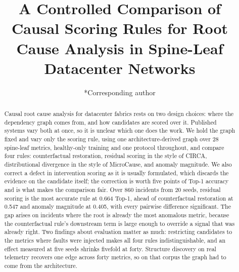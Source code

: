 \documentclass[conference]{IEEEtran}
\begin{document}
\title{A Controlled Comparison of Causal Scoring Rules for Root Cause Analysis in Spine-Leaf Datacenter Networks}


\author{
*Corresponding author
\and
{}
\and
{}
\and
{}
}

\maketitle

\begin{abstract}
Causal root cause analysis for datacenter fabrics rests on two design choices: where the dependency graph comes from, and how candidates are scored over it. Published systems vary both at once, so it is unclear which one does the work. We hold the graph fixed and vary only the scoring rule, using one architecture-derived graph over 28 spine-leaf metrics, healthy-only training and one protocol throughout, and compare four rules: counterfactual restoration, residual scoring in the style of CIRCA, distributional divergence in the style of MicroCause, and anomaly magnitude. We also correct a defect in intervention scoring as it is usually formulated, which discards the evidence on the candidate itself; the correction is worth five points of Top-1 accuracy and is what makes the comparison fair. Over 860 incidents from 20 seeds, residual scoring is the most accurate rule at 0.664 Top-1, ahead of counterfactual restoration at 0.547 and anomaly magnitude at 0.405, with every pairwise difference significant. The gap arises on incidents where the root is already the most anomalous metric, because the counterfactual rule's downstream term is large enough to override a signal that was already right. Two findings about evaluation matter as much: restricting candidates to the metrics where faults were injected makes all four rules indistinguishable, and an effect measured at five seeds shrinks fivefold at forty. Structure discovery on real telemetry recovers one edge across forty metrics, so on that corpus the graph had to come from the architecture.
\end{abstract}
\end{document}
